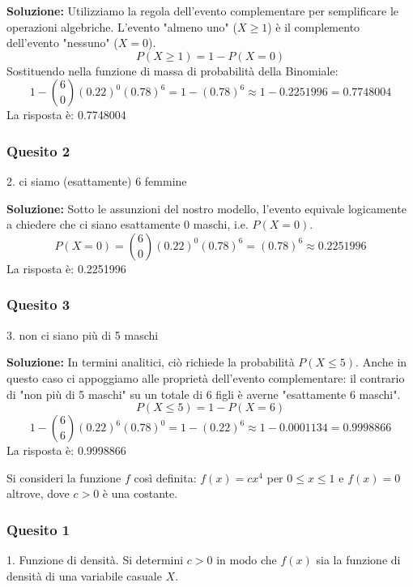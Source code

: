 \documentclass[12pt, a4paper]{article}
\begin{document}
\textbf{Soluzione:}
Utilizziamo la regola dell'evento complementare per semplificare le operazioni algebriche. L'evento "almeno uno" ($X \geq 1$) è il complemento dell'evento "nessuno" ($X = 0$).
$$ P(X \geq 1) = 1 - P(X=0) $$
Sostituendo nella funzione di massa di probabilità della Binomiale:
$$ 1 - \binom{6}{0} (0.22)^0 (0.78)^6 = 1 - (0.78)^6 \approx 1 - 0.2251996 = 0.7748004 $$
La risposta è: 0.7748004

\subsubsection*{Quesito 2}
2. ci siamo (esattamente) 6 femmine

\textbf{Soluzione:}
Sotto le assunzioni del nostro modello, l'evento equivale logicamente a chiedere che ci siano esattamente 0 maschi, i.e. $P(X=0)$.
$$ P(X=0) = \binom{6}{0} (0.22)^0 (0.78)^6 = (0.78)^6 \approx 0.2251996 $$
La risposta è: 0.2251996

\subsubsection*{Quesito 3}
3. non ci siano più di 5 maschi

\textbf{Soluzione:}
In termini analitici, ciò richiede la probabilità $P(X \leq 5)$.
Anche in questo caso ci appoggiamo alle proprietà dell'evento complementare: il contrario di "non più di 5 maschi" su un totale di 6 figli è averne "esattamente 6 maschi".
$$ P(X \leq 5) = 1 - P(X=6) $$
$$ 1 - \binom{6}{6} (0.22)^6 (0.78)^0 = 1 - (0.22)^6 \approx 1 - 0.0001134 = 0.9998866 $$
La risposta è: 0.9998866

\newpage

\vspace{0.5cm}
\begin{tcolorbox}[colback=lightergray!10, colframe=tocsec, title=\textbf{Esercizio 7}]
Si consideri la funzione $f$ così definita: $f(x)=cx^4$ per $0 \leq x \leq 1$ e $f(x)=0$ altrove, dove $c>0$ è una costante.
\end{tcolorbox}

\subsubsection*{Quesito 1}
1. Funzione di densità. Si determini $c>0$ in modo che $f(x)$ sia la funzione di densità di una variabile casuale $X$.
\end{document}

